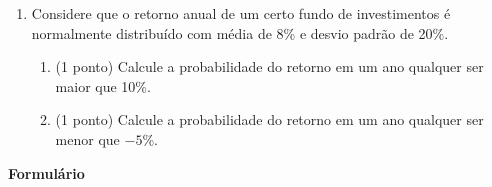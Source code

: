 \documentclass{article}
\begin{document}
\begin{enumerate}
\begin{enumerate}
	\item (1 ponto) Calcule a probabilidade do número de chamadas ficar acima da média.
\end{enumerate}

\item Considere que o retorno anual de um certo fundo de investimentos é normalmente distribuído com média de 8\% e desvio padrão de 20\%.
\begin{enumerate}
  	\item (1 ponto) Calcule a probabilidade do retorno em um ano qualquer ser maior que 10\%.
   	\item (1 ponto) Calcule a probabilidade do retorno em um ano qualquer ser menor que $-5$\%.
\end{enumerate} 


    
\end{enumerate}



\vspace{2cm}

\newpage
\begin{center}
	\Large{\textbf{Formulário}}
\end{center}
\end{document}

